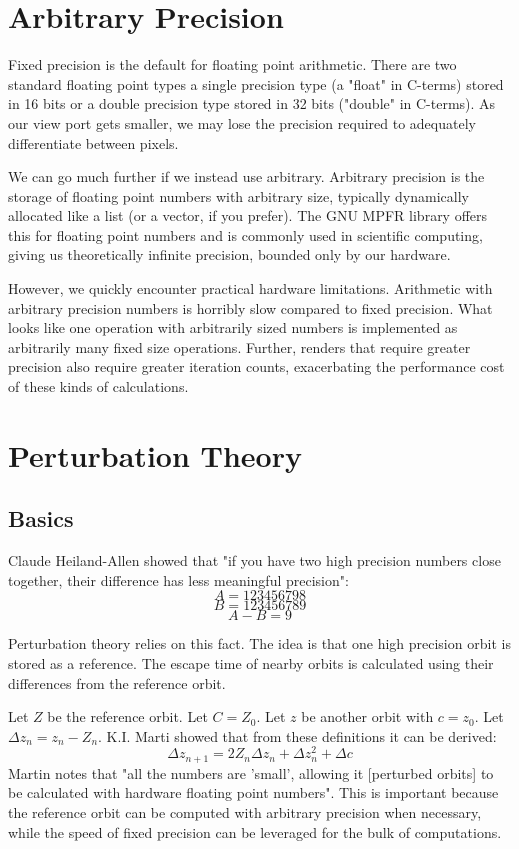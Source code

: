 \documentclass{article}
\begin{document}
\section{Arbitrary Precision}
\par Fixed precision is the default for floating point arithmetic. There are two standard floating point types a single precision type (a "float" in C-terms) stored in 16 bits or a double precision type stored in 32 bits ("double" in C-terms). As our view port gets smaller, we may lose the precision required to adequately differentiate between pixels.
\par We can go much further if we instead use arbitrary. Arbitrary precision is the storage of floating point numbers with arbitrary size, typically dynamically allocated like a list (or a vector, if you prefer). The GNU MPFR library offers this for floating point numbers and is commonly used in scientific computing, giving us theoretically infinite precision, bounded only by our hardware.
\par However, we quickly encounter practical hardware limitations. Arithmetic with arbitrary precision numbers is horribly slow compared to fixed precision. What looks like one operation with arbitrarily sized numbers is implemented as arbitrarily many fixed size operations. Further, renders that require greater precision also require greater iteration counts, exacerbating the performance cost of these kinds of calculations.
\section{Perturbation Theory}
\subsection{Basics}
\par Claude Heiland-Allen showed that "if you have two high precision numbers close together, their difference has less meaningful precision":
    \[ A = 123456798 \]
    \[ B = 123456789 \]
    \[ A - B = 9 \]\cite{Allen_2013_10}
\par Perturbation theory relies on this fact. The idea is that one high precision orbit is stored as a reference. The escape time of nearby orbits is calculated using their differences from the reference orbit.
\par Let $Z$ be the reference orbit. Let $C=Z_0$. Let $z$ be another orbit with $c=z_0$. Let $\Delta z_n = z_n - Z_n$. K.I. Marti showed that from these definitions it can be derived:
\[\Delta z_{n+1} = 2Z_n\Delta z_n+\Delta z_n^2 + \Delta c\]\cite{Martin_}
Martin notes that "all the numbers are ’small’, allowing it [perturbed orbits] to be calculated with hardware floating point numbers". This is important because the reference orbit can be computed with arbitrary precision when necessary, while the speed of fixed precision can be leveraged for the bulk of computations.
\end{document}
